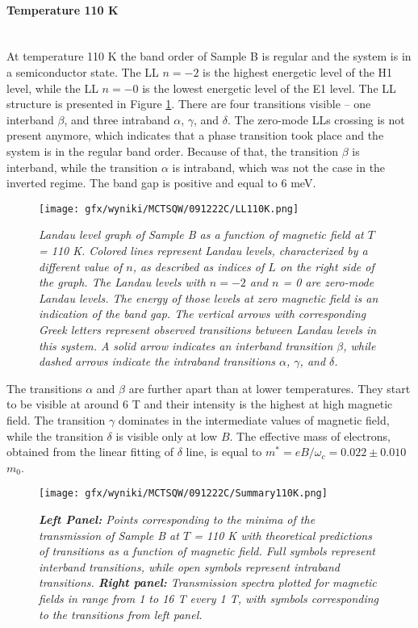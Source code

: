 \documentclass[titlepage,a4paper]{book}
\newcommand{\wciecie}{\quad\phantom{v}}
\newcommand{\myparagraph}[1]{\paragraph{#1}\mbox{}\\}
\begin{document}
\myparagraph{Temperature 110 K}
\wciecie
At temperature 110 K the band order of Sample B is regular and the system is in a semiconductor state. The LL $n = -2$ is the highest energetic level of the H1 level, while the LL $n = -0$ is the lowest energetic level of the E1 level. The LL structure is presented in Figure \ref{fig:LL_SQW_110K}. There are four transitions visible -- one interband $\beta$, and three intraband $\alpha$, $\gamma$, and $\delta$. The zero-mode LLs crossing is not present anymore, which indicates that a phase transition took place and the system is in the regular band order. Because of that, the transition $\beta$ is interband, while the transition $\alpha$ is intraband, which was not the case in the inverted regime. The band gap is positive and equal to 6 meV.

\begin{figure}[ht]
	\centering
	\texttt{[image: gfx/wyniki/MCTSQW/091222C/LL110K.png]}
	\vspace{-10pt}
	\caption{\textit{Landau level graph of Sample B as a function of magnetic field at $T$ = 110 K. Colored lines represent Landau levels, characterized by a different value of $n$, as described as indices of $L$ on the right side of the graph. The Landau levels with $n = -2$ and $n$ = 0 are zero-mode Landau levels. The energy of those levels at zero magnetic field is an indication of the band gap. The vertical arrows with corresponding Greek letters represent observed transitions between Landau levels in this system. A solid arrow indicates an interband transition $\beta$, while dashed arrows indicate the intraband transitions $\alpha$, $\gamma$, and $\delta$.}}
	\label{fig:LL_SQW_110K}
\end{figure}

The transitions $\alpha$ and $\beta$ are further apart than at lower temperatures. They start to be visible at around 6 T and their intensity is the highest at high magnetic field. The transition $\gamma$ dominates in the intermediate values of magnetic field, while the transition $\delta$ is visible only at low $B$. The effective mass of electrons, obtained from the linear fitting of $\delta$ line, is equal to $m^* = eB/\omega_c = 0.022 \pm 0.010$ $m_0$.

\begin{figure}[H]
	\centering
	\texttt{[image: gfx/wyniki/MCTSQW/091222C/Summary110K.png]}
	\vspace{-10pt}
	\caption{\textit{\textbf{Left Panel:} Points corresponding to the minima of the transmission of Sample B at $T$ = 110 K with theoretical predictions of transitions as a function of magnetic field. Full symbols represent interband transitions, while open symbols represent intraband transitions. \textbf{Right panel:} Transmission spectra plotted for magnetic fields in range from 1 to 16 T every 1 T, with symbols corresponding to the transitions from left panel.}}
	\label{fig:Summary_SQW_110K}
\end{figure}
\end{document}
